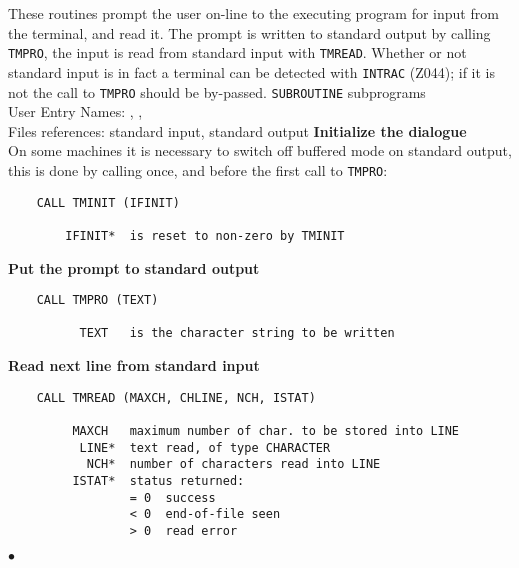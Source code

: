                            
                     
\Submitter{}                            
                       \Revised{}
These routines prompt the user on-line to the executing program
for input from the terminal, and read it.
The prompt is written to standard output by calling {\tt TMPRO},
the input is read from standard input with {\tt TMREAD}.
Whether or not standard input is in fact a terminal can be
detected with {\tt INTRAC} (Z044);
if it is not the call to {\tt TMPRO} should be by-passed.
\Structure
{\tt SUBROUTINE} subprograms \\
User Entry Names: , ,  \\
Files references: standard input, standard output
\Usage
{\bf Initialize the dialogue} \\[3mm]
On some machines it is necessary to switch off buffered mode
on standard output, this is done by calling once, and before
the first call to {\tt TMPRO}:
\begin{verbatim}
    CALL TMINIT (IFINIT)
 
        IFINIT*  is reset to non-zero by TMINIT
\end{verbatim}
{\bf Put the prompt to standard output}
\begin{verbatim}
    CALL TMPRO (TEXT)
 
          TEXT   is the character string to be written
\end{verbatim}
{\bf Read next line from standard input}
\begin{verbatim}
    CALL TMREAD (MAXCH, CHLINE, NCH, ISTAT)
 
         MAXCH   maximum number of char. to be stored into LINE
          LINE*  text read, of type CHARACTER
           NCH*  number of characters read into LINE
         ISTAT*  status returned:
                 = 0  success
                 < 0  end-of-file seen
                 > 0  read error
\end{verbatim}
$\bullet$
